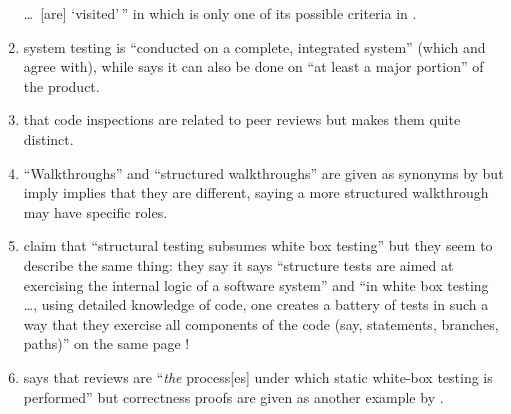 \begin{enumerate}
          \dots\ [are] `visited'\,'' in \citep[p.~19]{IEEE2021} which
          is only one of its possible criteria in \citep[pp.~82-83]{Patton2006}.
    \item %
           \citet[p.~456]{IEEE2017}  system
          testing is ``conducted on a complete, integrated system'' (which
          \citet[Tab.~12.3]{PetersAndPedrycz2000} and
          \citet[p.~439]{vanVliet2000} agree with), while
          \citet[p.~109]{Patton2006} says it can also be done on ``at least a
          major portion'' of the product.
    \item %
           \citetISTQB{}  that code inspections
          are related to peer reviews but \citet[pp.~94--95]{Patton2006} makes
          them quite distinct.
    \item %
          ``Walkthroughs'' and ``structured walkthroughs'' are given
          as synonyms by \citetISTQB{} but \citet[p.~484]{PetersAndPedrycz2000}
          \ifnotpaper imply \else implies \fi that they are different, saying a
          more structured walkthrough may have specific roles.
    \item %
          \citeauthor{PetersAndPedrycz2000} claim that ``structural testing
          subsumes white box testing'' but they seem to describe the same thing:
          \ifnotpaper they say \else it says \fi ``structure tests are aimed at
          exercising the internal logic of a software system'' and ``in white box
          testing \dots, using detailed knowledge of code, one creates a battery of
          tests in such a way that they exercise all components of the code
          (say, statements, branches, paths)'' on the same page
          \citeyearpar[p.~447]{PetersAndPedrycz2000}!
    \item %
           \citet[p.~92\ifnotpaper, emphasis added\fi]{Patton2006}
          says that reviews are ``\emph{the} process[es] under which static
          white-box testing is performed'' but correctness proofs are given
          as another example by \citet[pp.~418--419]{vanVliet2000}.


\end{enumerate}

